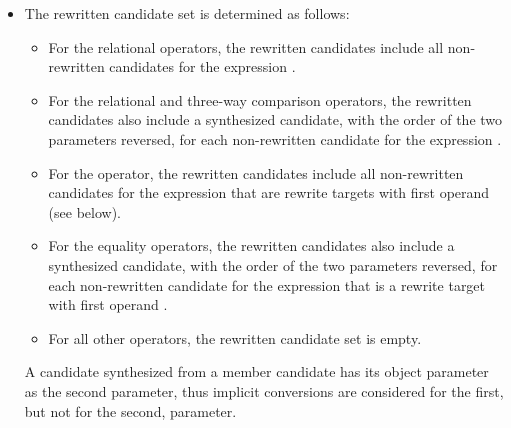 \begin{itemize}
\item
The rewritten candidate set is determined as follows:
\begin{itemize}
\item
For the relational operators,
the rewritten candidates include
all non-rewritten candidates
for the expression .
\item
For the
relational and
three-way comparison
operators,
the rewritten candidates also include
a synthesized candidate,
with the order of the two parameters reversed,
for each non-rewritten candidate
for the expression
.
\item
For the \tcode{!=} operator,
the rewritten candidates
include all non-rewritten candidates
for the expression 
that are rewrite targets with first operand  (see below).
\item
For the equality operators,
the rewritten candidates also include a synthesized candidate,
with the order of the two parameters reversed,
for each non-rewritten candidate
for the expression 
that is a rewrite target with first operand .
\item
For all other operators, the rewritten candidate set is empty.
\end{itemize}
\begin{note}
A candidate synthesized from a member candidate has its
object parameter as the second parameter, thus implicit conversions
are considered for the first, but not for the second, parameter.
\end{note}
\end{itemize}

